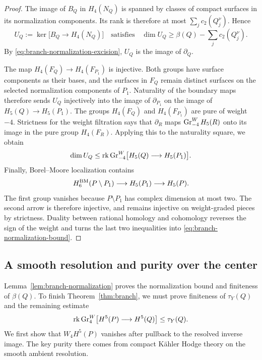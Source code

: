 \begin{proof}
The image of $B_Q$ in $H_4(N_Q)$ is spanned by classes of compact
surfaces in its normalization components.  Its rank is therefore at
most $\sum_jc_2(Q_j^\nu)$.  Hence
\[
 U_Q:=\ker\bigl[B_Q\longrightarrow H_4(N_Q)\bigr]
 \quad\text{satisfies}\quad
 \dim U_Q\geq\beta(Q)-\sum_jc_2(Q_j^\nu).
\]
By \eqref{eq:branch-normalization-excision}, $U_Q$ is the image of
$\partial_Q$.

The map $H_4(F_Q)\to H_4(F_{P_1})$ is injective.  Both groups have
surface components as their bases, and the surfaces in $F_Q$ remain
distinct surfaces on the selected normalization components of
$P_1$.  Naturality of the boundary maps therefore sends $U_Q$
injectively into the image of $\partial_{P_1}$ on the image of
$H_5(Q)\to H_5(P_1)$.  The groups $H_4(F_Q)$ and $H_4(F_{P_1})$
are pure of weight $-4$.  Strictness for the weight filtration
\cite[Theorem~2.3.5(iii)--(iv)]{DeligneHodgeII} says that
$\partial_R$ maps $\operatorname{Gr}^W_{-4}H_5(R)$ onto its image in the pure group
$H_4(F_R)$.  Applying this to the naturality square, we obtain
\[
 \dim U_Q\leq
 \operatorname{rk}\operatorname{Gr}^W_{-4}\bigl[H_5(Q)\longrightarrow H_5(P_1)\bigr].
\]
Finally, Borel--Moore localization contains
\[
 H^{\mathrm{BM}}_6(P\setminus P_1)\longrightarrow H_5(P_1)
                         \longrightarrow H_5(P).
\]
The first group vanishes because $P\setminus P_1$ has complex
dimension at most two.  The second arrow is therefore injective,
and remains injective on weight-graded pieces by strictness.  Duality
between rational homology and cohomology reverses the sign of the
weight and turns the last two inequalities into
\eqref{eq:branch-normalization-bound}.
\end{proof}

\subsection{A smooth resolution and purity over the center}

Lemma~\ref{lem:branch-normalization} proves the normalization bound
and finiteness of $\beta(Q)$.  To finish Theorem~\ref{thm:branch}, we
must prove finiteness of $\tau_Y(Q)$ and the remaining estimate
\[
 \operatorname{rk}\operatorname{Gr}^W_4\bigl[H^5(P)\longrightarrow H^5(Q)\bigr]\leq\tau_Y(Q).
\]
We first show that $W_4H^5(P)$ vanishes after pullback to the resolved
inverse image.  The key purity there comes from compact K\"ahler Hodge
theory on the smooth ambient resolution.

